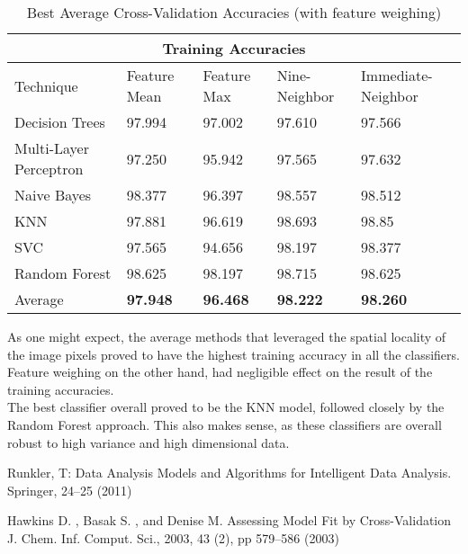 \documentclass{llncs}
\begin{document}
\begin{table}
	\centering
	\caption{Best Average Cross-Validation Accuracies (with feature weighing) }
	\begin{tabular}{ |p{3cm}||p{2cm}|p{2cm}|p{2cm}| p{2cm}| }
		\hline
		\multicolumn{5}{|c|}{Training Accuracies} \\
		\hline
		Technique& Feature Mean & Feature Max & Nine-Neighbor & Immediate-Neighbor\\
		\hline
		Decision Trees              &97.994    &97.002      &97.610     &97.566\\
		Multi-Layer Perceptron      &97.250    &95.942      &97.565     &97.632\\
		Naive Bayes                 &98.377    &96.397      &98.557    &98.512\\
		KNN                         &97.881    &96.619      &98.693     &98.85\\
		SVC                         &97.565    &94.656      &98.197     &98.377\\
		Random Forest               &98.625    &98.197      &98.715     &98.625\\
		\hline
		 Average     &\textbf{97.948}     &\textbf{96.468}       &\textbf{98.222}     &\textbf{98.260}\\
		 \hline
	\end{tabular}
	\label{table}
\end{table}

As one might expect, the average methods that leveraged the spatial locality of the image pixels proved to have the highest training accuracy in all the classifiers. Feature weighing on the other hand, had negligible effect on the result of the training accuracies.\\
The best classifier overall proved to be the KNN model, followed closely by the Random Forest approach. This also makes sense, as these classifiers are overall robust to high variance and high dimensional data.

%
%
\begin{thebibliography}{5}
%
Runkler, T:
Data Analysis 
Models and Algorithms for Intelligent Data Analysis.
Springer, 24--25 (2011)

Hawkins D. , Basak S. , and Denise M. 
Assessing Model Fit by Cross-Validation
J. Chem. Inf. Comput. Sci., 2003, 43 (2), pp 579–586 (2003)

\end{thebibliography}
\end{document}
